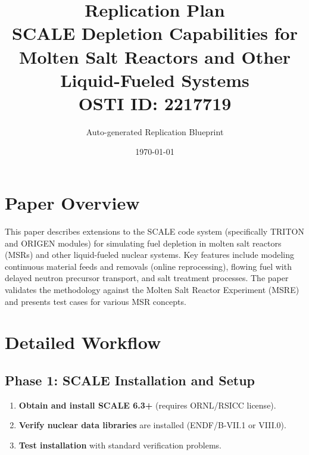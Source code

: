\documentclass[11pt,a4paper]{article}
\title{\textbf{Replication Plan}\\[0.5em]
\large SCALE Depletion Capabilities for Molten Salt Reactors and Other Liquid-Fueled Systems\\[0.3em]
\normalsize OSTI ID: 2217719}
\author{Auto-generated Replication Blueprint}
\date{\today}
\begin{document}
\maketitle
\tableofcontents
\newpage

\section{Paper Overview}
This paper describes extensions to the SCALE code system (specifically TRITON and ORIGEN modules) for simulating fuel depletion in molten salt reactors (MSRs) and other liquid-fueled nuclear systems. Key features include modeling continuous material feeds and removals (online reprocessing), flowing fuel with delayed neutron precursor transport, and salt treatment processes. The paper validates the methodology against the Molten Salt Reactor Experiment (MSRE) and presents test cases for various MSR concepts.

\section{Detailed Workflow}

\subsection{Phase 1: SCALE Installation and Setup}
\begin{enumerate}[label=\textbf{1.\arabic*}]
  \item \textbf{Obtain and install SCALE 6.3+} (requires ORNL/RSICC license).
  \item \textbf{Verify nuclear data libraries} are installed (ENDF/B-VII.1 or VIII.0).
  \item \textbf{Test installation} with standard verification problems.
\end{enumerate}
\end{document}
